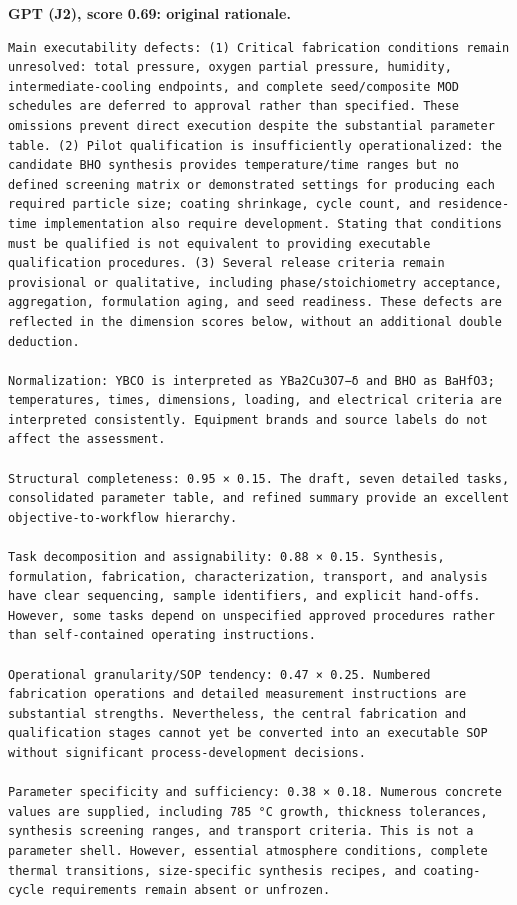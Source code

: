 \noindent\textbf{GPT (J2), score 0.69: original rationale.}
\begin{lstlisting}[style=jsonstyle,basicstyle=\fontsize{8}{9.6}\selectfont\ttfamily,backgroundcolor=\color{white}]
Main executability defects: (1) Critical fabrication conditions remain unresolved: total pressure, oxygen partial pressure, humidity, intermediate-cooling endpoints, and complete seed/composite MOD schedules are deferred to approval rather than specified. These omissions prevent direct execution despite the substantial parameter table. (2) Pilot qualification is insufficiently operationalized: the candidate BHO synthesis provides temperature/time ranges but no defined screening matrix or demonstrated settings for producing each required particle size; coating shrinkage, cycle count, and residence-time implementation also require development. Stating that conditions must be qualified is not equivalent to providing executable qualification procedures. (3) Several release criteria remain provisional or qualitative, including phase/stoichiometry acceptance, aggregation, formulation aging, and seed readiness. These defects are reflected in the dimension scores below, without an additional double deduction.

Normalization: YBCO is interpreted as YBa2Cu3O7−δ and BHO as BaHfO3; temperatures, times, dimensions, loading, and electrical criteria are interpreted consistently. Equipment brands and source labels do not affect the assessment.

Structural completeness: 0.95 × 0.15. The draft, seven detailed tasks, consolidated parameter table, and refined summary provide an excellent objective-to-workflow hierarchy.

Task decomposition and assignability: 0.88 × 0.15. Synthesis, formulation, fabrication, characterization, transport, and analysis have clear sequencing, sample identifiers, and explicit hand-offs. However, some tasks depend on unspecified approved procedures rather than self-contained operating instructions.

Operational granularity/SOP tendency: 0.47 × 0.25. Numbered fabrication operations and detailed measurement instructions are substantial strengths. Nevertheless, the central fabrication and qualification stages cannot yet be converted into an executable SOP without significant process-development decisions.

Parameter specificity and sufficiency: 0.38 × 0.18. Numerous concrete values are supplied, including 785 °C growth, thickness tolerances, synthesis screening ranges, and transport criteria. This is not a parameter shell. However, essential atmosphere conditions, complete thermal transitions, size-specific synthesis recipes, and coating-cycle requirements remain absent or unfrozen.


\end{lstlisting}

